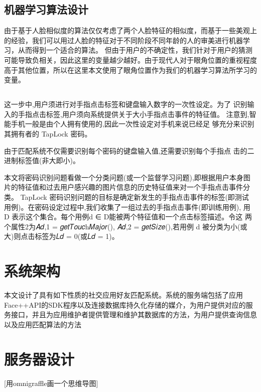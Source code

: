 \subsection{机器学习算法设计}
由于基于人脸相似度的算法仅仅考虑了两个人脸特征的相似度，而基于一些美观上的经验，我们可以用过人脸的特征对于不同阶段不同年龄的人的审美进行机器学习，从而得到一个适合的算法。
但由于用户的不确定性，我们针对于用户的猜测可能导致负相关，因此这里的变量越少越好。由于现代人对于眼角位置的重视程度高于其他位置，所以在这里本文使用了眼角位置作为我们的机器学习算法所学习的变量。
\subsection{}





这一步中,用户须进行对手指点击标签和键盘输入数字的一次性设定。为了 识别输入的手指点击标签,用户须向系统提供关于大小手指点击事件的特征值。 注意到,智能手机一般是由个人拥有使用的,因此一次性设定对手机来说已经足 够充分来识别其拥有者的 TapLock 密码。



由于匹配系统不仅需要识别每个密码的键盘输入值,还需要识别每个手指点 击的二进制标签值(非大即小)。

本文将密码识别问题看做一个分类问题(或一个监督学习问题),即根据用户本身图片的特征值和过去用户感兴趣的图片信息的历史特征值来对一个手指点击事件分类。
TapLock 密码识别问题的目标是确定新发生的手指点击事件的标签(即测试 用例)。在密码设定过程中,我们收集了一组过去的手指点击事件(即训练用例), 用 D 表示这个集合。每个用例d ∈ D能被两个特征值和一个点击标签描述。令这 两个属性2为𝐴𝑑,1 = 𝑔𝑒𝑡𝑇𝑜𝑢𝑐h𝑀𝑎𝑗𝑜𝑟(), 𝐴𝑑,2 = 𝑔𝑒𝑡𝑆𝑖𝑧𝑒(),若用例 d 被分类为小(或 大)则点击标签为𝐿𝑑 = 0(或𝐿𝑑 = 1)。

\section{系统架构}
本文设计了具有如下性质的社交应用好友匹配系统。系统的服务端包括了应用Face++API的SDK程序以及连接数据库持久化存储的媒介，为用户提供对应的服务接口，并且为应用维护者提供管理和维护其数据库的方法，为用户提供查询信息以及应用匹配算法的方法
\section{服务器设计}

[用omnigraffle画一个思维导图]

